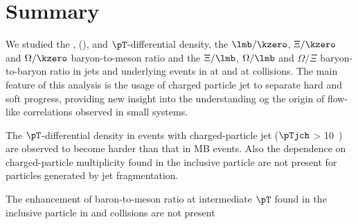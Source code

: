 
\clearpage
\section{Summary}%
\label{sec:Summary}

We studied the \kzero, \lmb (\almb), \Xis and \Oms $\pT$-differential density, the $\lmb/\kzero$, $\Xi/\kzero$ and $\Omega/\kzero$ baryon-to-meson ratio and the $\Xi/\lmb$, $\Omega/\lmb$ and $\Omega/\Xi$ baryon-to-baryon ratio in jets and underlying events in \pp at \thirteen and \pPb at \fivenn collisions. The main feature of this analysis is the usage of charged particle jet to separate hard and soft progress, providing new insight into the understanding og the origin of flow-like correlations observed in small systems.

The $\pT$-differential density in events with charged-particle jet ($\pTjch$ > 10~\GeVc) are observed to become harder than that in MB events. Also the dependence on charged-particle multiplicity found in the inclusive particle are not present for particles generated by jet fragmentation. 

The enhancement of baron-to-meson ratio at intermediate $\pT$ found in the inclusive particle in \pp and \pPb collisions are not present 